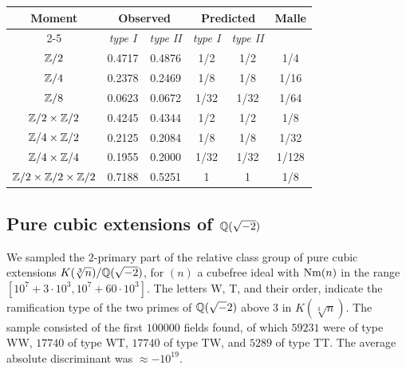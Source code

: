 \documentclass[11pt,a4paper]{amsart}
\def\Z{{\rm \mathbb{Z}}}
\def\Q{{\rm \mathbb{Q}}}
\def\Nm{{\rm Nm}}
\numberwithin{equation}{section}
\begin{document}
\begin{center}
\begin{tabular}{|c|c||c|c||c|c|}\hline
\multirow{2}{*}{\textbf{Moment}} & \multicolumn{2}{c|}{\textbf{Observed}} & \multicolumn{2}{c|}{\textbf{Predicted}} & \multirow{2}{*}{\textbf{Malle}} \\ \cline{2-5}
& \textit{type I} & \textit{type II} & \textit{type I} & \textit{type II} &  \\ \hline 
$\Z/2$ & 0.4717 & 0.4876 & \cellcolor{lightgray} 1/2 & \cellcolor{lightgray} 1/2 & 1/4 \\ \hline 
$\Z/4$ & 0.2378 & 0.2469 & 1/8 & 1/8 & 1/16 \\ \hline
$\Z/8$ & 0.0623 & 0.0672 & 1/32 & 1/32 & 1/64 \\ \hline
$\Z/2 \times \Z/2$ & 0.4245 & 0.4344 & \cellcolor{lightgray} 1/2 & \cellcolor{lightgray} 1/2 & 1/8 \\ \hline
$\Z/4 \times \Z/2$ & 0.2125 & 0.2084 & 1/8 & 1/8 & 1/32 \\ \hline
$\Z/4 \times \Z/4$ & 0.1955 & 0.2000 & 1/32 & 1/32 & 1/128 \\ \hline
$\Z/2 \times \Z/2 \times \Z/2$ & 0.7188 & 0.5251 & \cellcolor{lightgray} 1 & \cellcolor{lightgray} 1 & 1/8 \\ \hline
\end{tabular}
\end{center}


\subsection{Pure cubic extensions of $\Q(\sqrt{-2})$} 
\label{tbl: pure cubic extensions of Q(sqrt(-2))}

We sampled the $2$-primary part of the relative class group of pure cubic extensions $K(\sqrt[3]{n})/\Q(\sqrt{-2})$, for $(n)$ a cubefree ideal with $\Nm(n)$ in the range $[10^7+3 \cdot 10^3,10^7+60 \cdot 10^3]$. The letters W, T, and their order, indicate the ramification type of the two primes of $\Q(\sqrt-2)$ above $3$ in $K(\sqrt[3]{n})$. The sample consisted of the first $100000$ fields found, of which $59231$ were of type WW, $17740$ of type WT, $17740$ of type TW, and $5289$ of type TT. The average absolute discriminant was $\approx -10^{19}$.  \\
\end{document}

